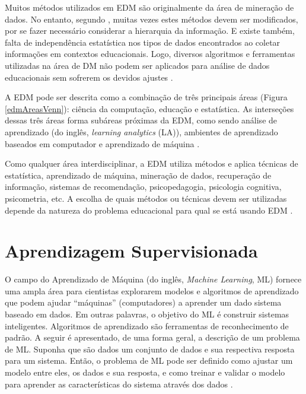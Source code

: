 Muitos métodos utilizados em EDM são originalmente da área de mineração de
dados. No entanto, segundo , muitas vezes estes
métodos devem ser modificados, por se fazer necessário considerar a hierarquia
da informação. E existe também, falta de independência estatística nos tipos de
dados encontrados ao coletar informações em contextos educacionais. Logo,
diversos algoritmos e ferramentas utilizadas na área de DM não podem ser
aplicados para análise de dados educacionais sem sofrerem os devidos ajustes
\cite{baker2011mineraccao,costa2012mineraccao}.

A EDM pode ser descrita como a combinação de três principais áreas (Figura
\ref{edmAreasVenn}): ciência da computação, educação e estatística. As
interseções dessas três áreas forma subáreas próximas da EDM, como sendo análise
de aprendizado (do inglês, \textit{learning analytics} (LA)), ambientes de
aprendizado baseados em computador e aprendizado de máquina
\cite{romero2013data}.


Como qualquer área interdisciplinar, a EDM utiliza métodos e aplica técnicas de
estatística, aprendizado de máquina, mineração de dados, recuperação de
informação, sistemas de recomendação, psicopedagogia, psicologia cognitiva,
psicometria, etc. A escolha de quais métodos ou técnicas devem ser utilizadas
depende da natureza do problema educacional para qual se está usando EDM
\cite{bousbia2014contribution}.

\section{Aprendizagem Supervisionada}

O campo do Aprendizado de Máquina (do inglês, \textit{Machine Learning}, ML)
fornece uma ampla área para cientistas explorarem modelos e algoritmos de
aprendizado que podem ajudar ``máquinas'' (computadores) a aprender um dado
sistema baseado em dados. Em outras palavras, o objetivo do ML é construir
sistemas inteligentes. Algoritmos de aprendizado são ferramentas de
reconhecimento de padrão. A seguir é apresentado, de uma forma geral, a
descrição de um problema de ML. Suponha que são dados um conjunto de dados e sua
respectiva resposta para um sistema. Então, o problema de ML pode ser definido
como ajustar um modelo entre eles, os dados e sua resposta, e como treinar e
validar o modelo para aprender as características do sistema através dos dados
\cite{suthaharan2016machine}.

